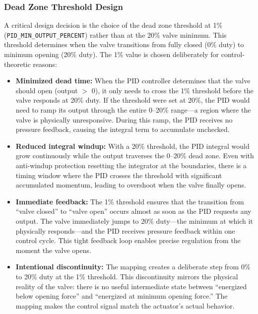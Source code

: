 \subsubsection{Dead Zone Threshold Design}
A critical design decision is the choice of the dead zone threshold at 1\% (\texttt{PID\_MIN\_OUTPUT\_PERCENT}) rather than at the 20\% valve minimum. This threshold determines when the valve transitions from fully closed (0\% duty) to minimum opening (20\% duty). The 1\% value is chosen deliberately for control-theoretic reasons:

\begin{itemize}
    \item \textbf{Minimized dead time:} When the PID controller determines that the valve should open (output $>$ 0), it only needs to cross the 1\% threshold before the valve responds at 20\% duty. If the threshold were set at 20\%, the PID would need to ramp its output through the entire 0--20\% range---a region where the valve is physically unresponsive. During this ramp, the PID receives no pressure feedback, causing the integral term to accumulate unchecked.
    
    \item \textbf{Reduced integral windup:} With a 20\% threshold, the PID integral would grow continuously while the output traverses the 0--20\% dead zone. Even with anti-windup protection resetting the integrator at the boundaries, there is a timing window where the PID crosses the threshold with significant accumulated momentum, leading to overshoot when the valve finally opens.
    
    \item \textbf{Immediate feedback:} The 1\% threshold ensures that the transition from ``valve closed'' to ``valve open'' occurs almost as soon as the PID requests any output. The valve immediately jumps to 20\% duty---the minimum at which it physically responds---and the PID receives pressure feedback within one control cycle. This tight feedback loop enables precise regulation from the moment the valve opens.
    
    \item \textbf{Intentional discontinuity:} The mapping creates a deliberate step from 0\% to 20\% duty at the 1\% threshold. This discontinuity mirrors the physical reality of the valve: there is no useful intermediate state between ``energized below opening force'' and ``energized at minimum opening force.'' The mapping makes the control signal match the actuator's actual behavior.
\end{itemize}

